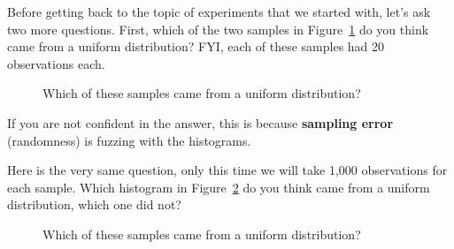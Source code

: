 \documentclass[
  letterpaper,
  DIV=11,
  numbers=noendperiod]{scrreprt}
\begin{document}
Before getting back to the topic of experiments that we started with,
let's ask two more questions. First, which of the two samples in
Figure~\ref{fig-5whichoneB} do you think came from a uniform
distribution? FYI, each of these samples had 20 observations each.

\begin{figure}


\caption{\label{fig-5whichoneB}Which of these samples came from a
uniform distribution?}

\end{figure}%

If you are not confident in the answer, this is because \textbf{sampling
error} (randomness) is fuzzing with the histograms.

Here is the very same question, only this time we will take 1,000
observations for each sample. Which histogram in
Figure~\ref{fig-5whichoneC} do you think came from a uniform
distribution, which one did not?

\begin{figure}


\caption{\label{fig-5whichoneC}Which of these samples came from a
uniform distribution?}

\end{figure}%
\end{document}

